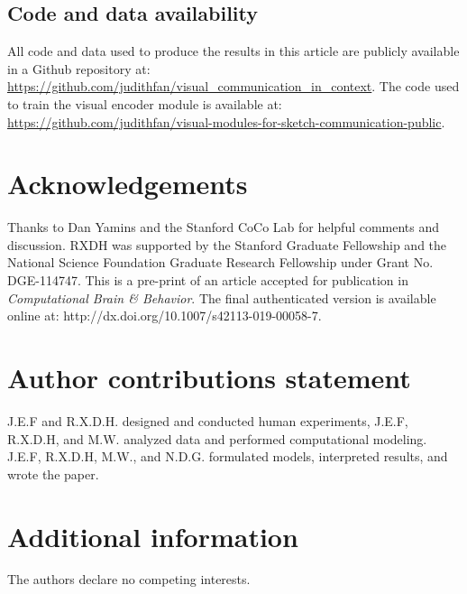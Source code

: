 \documentclass{svjour3}
\begin{document}
\subsection*{Code and data availability} All code and data used to produce the results in this article are publicly available in a Github repository at: \url{https://github.com/judithfan/visual_communication_in_context}. The code used to train the visual encoder module is available at: \url{https://github.com/judithfan/visual-modules-for-sketch-communication-public}.

\section*{Acknowledgements}

Thanks to Dan Yamins and the Stanford CoCo Lab for helpful comments and discussion. 
RXDH was supported by the Stanford Graduate Fellowship and the National Science Foundation Graduate Research Fellowship under Grant No. DGE-114747.
This is a pre-print of an article accepted for publication in \textit{Computational Brain \& Behavior}. 
The final authenticated version is available online at: http://dx.doi.org/10.1007/s42113-019-00058-7.

\section*{Author contributions statement}

J.E.F and R.X.D.H. designed and conducted human experiments, J.E.F, R.X.D.H, and M.W. analyzed data and performed computational modeling. J.E.F, R.X.D.H, M.W., and N.D.G. formulated models, interpreted results, and wrote the paper.

\section*{Additional information}

The authors declare no competing interests.




\newpage

\end{document}
